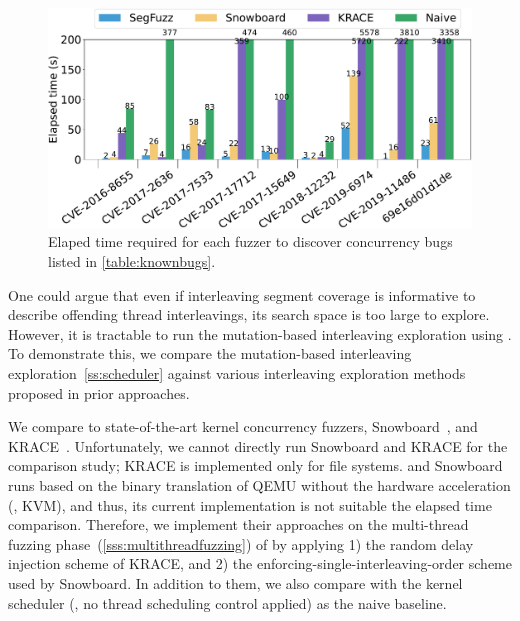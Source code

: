 \begin{figure}[t]
  \centering
  \includegraphics[width=0.99\linewidth]{fig/comparison_graph_time-crop.pdf}
  \caption{Elaped time required for each fuzzer to discover
    concurrency bugs listed in \autoref{table:knownbugs}.}
  \label{fig:eval:comparison-time}
  \vspace{-8pt}
\end{figure}


%
One could argue that even if interleaving segment coverage is
informative to describe offending thread interleavings, 
its search space is too large to explore.
%
However, it is tractable to run the mutation-based interleaving exploration
using \intcov.
To demonstrate this, we compare the mutation-based interleaving
exploration~\autoref{ss:scheduler} against various interleaving
exploration methods proposed in prior approaches.

%
We compare \sys to state-of-the-art kernel concurrency fuzzers,
Snowboard~\cite{snowboard}, and KRACE~\cite{krace}.
%
Unfortunately, we cannot directly run Snowboard and KRACE for the
comparison study; KRACE is implemented only for file systems. and
Snowboard runs based on the binary translation of QEMU without the
hardware acceleration (\ie, KVM), and thus, its current implementation
is not suitable the elapsed time comparison.
%
Therefore, we implement their approaches on the multi-thread fuzzing
phase~(\autoref{sss:multithreadfuzzing}) of \sys by applying 1) the
random delay injection scheme of KRACE, and 2) the
enforcing-single-interleaving-order scheme used by Snowboard.
%
In addition to them, we also compare with the kernel scheduler 
(\ie, no thread scheduling control applied) as the naive baseline.

